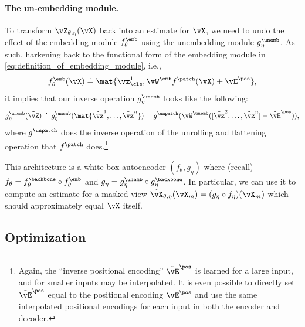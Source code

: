 \documentclass[../../book-main.tex]{subfiles}
\begin{document}
\paragraph{The un-embedding module.} To transform
\(\tilde{\vZ}_{\theta, \eta}(\vX)\) back into an estimate for
\(\vX\), we need to undo the effect of the embedding module
\(f_{\theta}^{\emb}\) using the unembedding module
\(g_{\eta}^{\unemb}\). As such, harkening back to the functional form
of the embedding module in \eqref{eq:definition_of_embedding_module}, i.e.,
\begin{equation}
f_{\theta}^{\emb}(\vX) \doteq \mat{\vz_{\cls}^{1},
\vW^{\emb}f^{\patch}(\vX) + \vE^{\pos}} ,
\end{equation}
it implies that our inverse operation \(g_{\eta}^{\unemb}\) looks
like the following:
\begin{equation}
g_{\eta}^{\unemb}(\tilde{\vZ}) \doteq
g_{\eta}^{\unemb}(\mat{\tilde{\vz}^{1}, \dots, \tilde{\vz}^{n}}) =
g^{\unpatch}(\vW^{\unemb}([\tilde{\vz}^{2}, \dots, \tilde{\vz}^{n}] -
\tilde{\vE}^{\pos})) ,
\end{equation}
where \(g^{\unpatch}\) does the inverse operation of the unrolling
and flattening operation that \(f^{\patch}\) does.\footnote{Again,
the ``inverse positional encoding'' \(\tilde{\vE}^{\pos}\) is learned
for a large input, and for smaller inputs may be interpolated. It is
even possible to directly set \(\tilde{\vE}^{\pos}\) equal to the
positional encoding \(\vE^{\pos}\) and use the same interpolated
positional encodings for each input in both the encoder and decoder.}

This architecture is a white-box autoencoder \((f_{\theta},
g_{\eta})\) where (recall) \(f_{\theta} = f_{\theta}^{\backbone}
\circ f_{\theta}^{\emb}\) and \(g_{\eta} = g_{\eta}^{\unemb} \circ
g_{\eta}^{\backbone}\). In particular, we can use it to compute an
estimate for a masked view \(\hat{\vX}_{\theta, \eta}(\vX_{m}) =
(g_{\eta} \circ f_{\eta})(\vX_{m})\) which should approximately equal
\(\vX\) itself.

\subsection{Optimization}\label{sub:image_completion_optimization}
\end{document}
